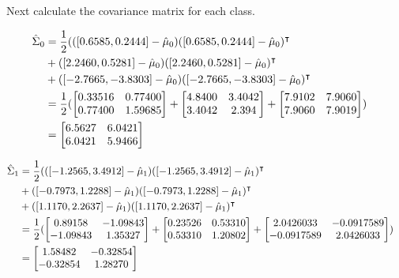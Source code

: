 \documentclass{jhwhw}
\begin{document}
    Next calculate the covariance matrix for each class.

    \begin{align*}
	\Hat{\Sigma}_0 &= \frac{1}{2}(
	    ([0.6585, 0.2444] - \Hat{\mu}_0)([0.6585, 0.2444] - \Hat{\mu}_0)^\intercal &\\
	    &+ ([2.2460, 0.5281] - \Hat{\mu}_0)([2.2460, 0.5281] - \Hat{\mu}_0)^\intercal &\\
	    &+ ([-2.7665, -3.8303] - \Hat{\mu}_0)([-2.7665, -3.8303] - \Hat{\mu}_0)^\intercal &\\
	    &= 
		\frac{1}{2} (
		    \begin{bmatrix}
			0.33516 & 0.77400 \\
			0.77400 & 1.59685 \\
		    \end{bmatrix}
		    +
		    \begin{bmatrix}
			4.8400 & 3.4042 \\
			3.4042 & 2.394
		    \end{bmatrix}
		    +
		    \begin{bmatrix}
			7.9102 & 7.9060 \\
			7.9060 & 7.9019 \\
		    \end{bmatrix}
		) &\\
	    &=
		\begin{bmatrix}
		    6.5627 & 6.0421 \\
		    6.0421 & 5.9466
		\end{bmatrix}
    \end{align*}

    \begin{align*}
	\Hat{\Sigma}_1 &= \frac{1}{2}(
	    ([-1.2565, 3.4912] - \Hat{\mu}_1)([-1.2565, 3.4912] - \Hat{\mu}_1)^\intercal &\\
	    &+ ([-0.7973, 1.2288] - \Hat{\mu}_1)([-0.7973, 1.2288] - \Hat{\mu}_1)^\intercal &\\
	    &+ ([1.1170, 2.2637] - \Hat{\mu}_1)([1.1170, 2.2637] - \Hat{\mu}_1)^\intercal &\\
	    &= 
		\frac{1}{2} (
		    \begin{bmatrix}
			0.89158 & -1.09843 \\
			-1.09843 & 1.35327
		    \end{bmatrix}
		    +
		    \begin{bmatrix}
			0.23526 & 0.53310 \\
			0.53310 & 1.20802 
		    \end{bmatrix}
		    +
		    \begin{bmatrix}
			2.0426033 & -0.0917589 \\
			-0.0917589 & 2.0426033
		    \end{bmatrix}
		) &\\
	    &=
		\begin{bmatrix}
		    1.58482 & -0.32854 \\
		    -0.32854 & 1.28270 
		\end{bmatrix}
    \end{align*}
\end{document}
